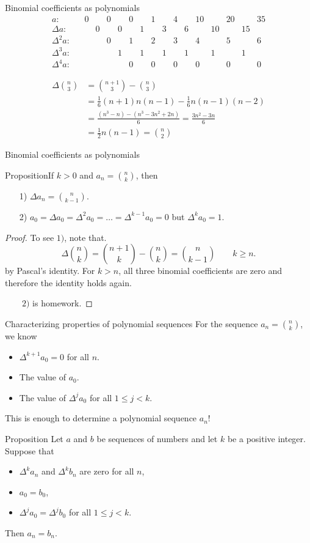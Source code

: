\documentclass{beamer}
\def\bl[#1]#2{\begin{block}{#1}#2\end{block}}
\begin{document}
\begin{frame}{Binomial coefficients as polynomials}
\[
\begin{array}{rcccccccccccccccc}
a:&&0&&0&&0&&1&&4&&10&&20&&35\\
\Delta a:&&&0&&0&&1&&3&&6&&10&&15\\
\Delta^2 a:&&&&0&&1&&2&&3&&4&&5&&6\\
\Delta^3 a:&&&&&1&&1&&1&&1&&1&&1\\
\Delta^4 a:&&&&&&0&&0&&0&&0&&0&&0
\end{array}
\]

\begin{align*}
\Delta\binom{n}{3}&=\binom{n+1}{3}-\binom{n}{3}\\
&=\frac{1}{6}(n+1)n(n-1)-\frac{1}{6}n(n-1)(n-2)\\
&=\frac{(n^3-n)-(n^3-3n^2+2n)}{6}=\frac{3n^2-3n}{6}\\
&=\frac{1}{2}n(n-1)=\binom{n}{2}
\end{align*}
\end{frame}

\begin{frame}{Binomial coefficients as polynomials}


\bl[Proposition]{If $k>0$ and $a_n=\binom{n}{k}$, then
\begin{enumerate}
\item[1)] $\Delta a_n=\binom{n}{k-1}$.
\item[2)] $a_0=\Delta a_0=\Delta^2 a_0=\dots=\Delta^{k-1}a_0=0$
but $\Delta^k a_0=1$.
\end{enumerate}
}
\begin{proof}
To see $1)$, note that.
\[
\Delta\binom{n}{k}=\binom{n+1}{k}-\binom{n}{k}=\binom {n}{k-1} \qquad k\geq n. 
\]
by Pascal's identity. For $k>n$, all three binomial coefficients are zero and therefore the identity holds again.

~~~~$2)$ is homework.
\end{proof}

\end{frame}

\begin{frame}{Characterizing properties of polynomial sequences}
For the sequence $a_n=\binom{n}{k}$, we know
\begin{itemize}
\item $\Delta^{k+1}a_0=0$ for all $n$.
\item The value of $a_0$.
\item The value of $\Delta^{j}a_0$ for all $1\leq j<k$.
\end{itemize}

This is enough to determine a polynomial sequence $a_n$!

\bl[Proposition]{
Let $a$ and $b$ be sequences of numbers and let $k$ be a positive integer. Suppose that
\begin{itemize}
\item $\Delta^ka_n$ and $\Delta^kb_n$ are zero for all $n$,
\item $a_0=b_0$,
\item $\Delta^ja_0=\Delta^jb_0$ for all $1\leq j<k$.
\end{itemize}
Then $a_n=b_n$.
}
\end{frame}
\end{document}
